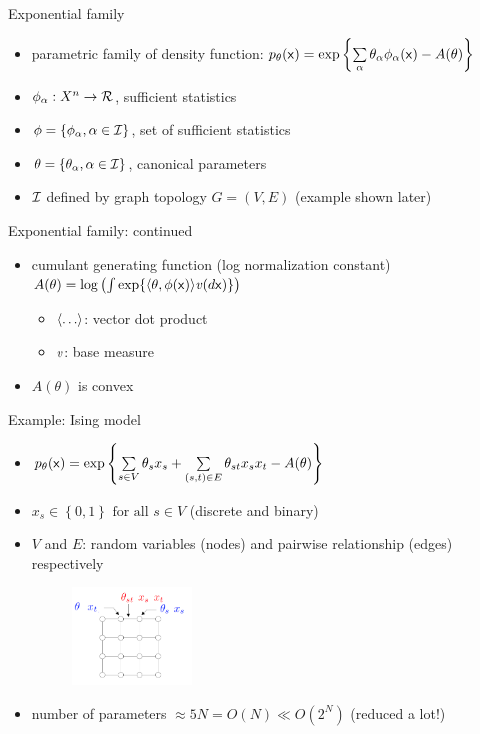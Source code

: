 \documentclass[t]{beamer}
\newcommand{\vx}{\ensuremath{\mathsf{x}}}
\newcommand{\vparam}{\ensuremath{\theta}}
\newcommand{\param}{\ensuremath{\theta_{\alpha}}}
\newcommand{\vsuff}{\ensuremath{\phi}}
\newcommand{\suff}{\ensuremath{\phi_{\alpha}}}
\newcommand{\set}[1]{\ensuremath{\left\{ #1 \right\}}}
\begin{document}
\begin{frame}{Exponential family}
   \begin{itemize}
	\item parametric family of density function: $\pp(\vx) = \exp \set{\sum\limits_{\alpha} \param \suff (\vx) - A(\vparam) }$
	   		\item $\suff: X^n \rightarrow \real$, sufficient statistics
        	\item $\vsuff = \set{\suff, \alpha \in \suffset}$, set of sufficient statistics
        	\item $\vparam = \set{\param, \alpha \in \suffset}$, canonical parameters
        	\item $\mathcal{I}$ defined by graph topology $G=(V, E)$ (example shown later)
   \end{itemize}
\end{frame}

\begin{frame}{Exponential family: continued}
   \begin{itemize}
	\item {cumulant generating function (log normalization constant) 
   	$A(\vparam) = \log \left( \int \exp \{ \innerprod{\vparam, \vsuff(\vx)} \measure (d \vx) \} \right)$
	   \begin{itemize}
	   		\item {$\langle \ldots \rangle$: vector dot product}
	   		\item {$\mathit{v}$: base measure}	   		
	   \end{itemize}	   		
	}
	\item $A(\vparam)$ is convex
   \end{itemize}
\end{frame}

\begin{frame}{Example: Ising model}
	\begin{itemize}
		\item $\pp(\vx) = \exp \set{\sum\limits_{s \in V} \theta_s x_s + \sum\limits_{(s, t) \in E} \theta_{st} x_s x_t  - A(\theta) }$
		\item $x_s \in \set{0, 1} \text{ for all } s \in V$ (discrete and binary)
		\item {$V$ and $E$: random variables (nodes) and  pairwise relationship (edges) respectively
			\begin{figure}
				\includegraphics[width=0.3\textwidth]{ising}
			\end{figure}
		}
		\item number of parameters $\approx 5N = O(N) \ll O(2^N) $ (reduced a lot!)
	\end{itemize}
\end{frame}
\end{document}
